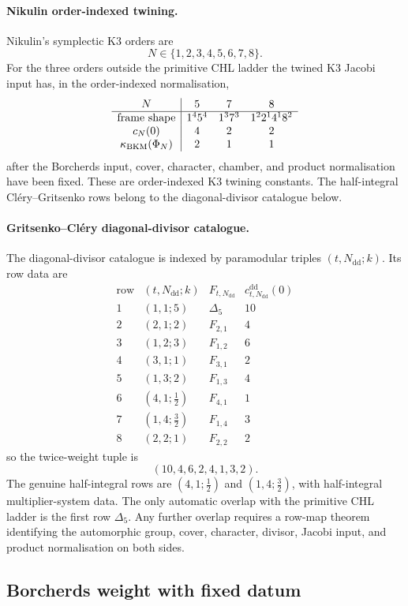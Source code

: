 \paragraph{Nikulin order-indexed twining.}
Nikulin's symplectic K3 orders are
\[
  N\in\{1,2,3,4,5,6,7,8\}.
\]
For the three orders outside the primitive CHL ladder the twined K3
Jacobi input has, in the order-indexed normalisation,
\[
\begin{array}{c|ccc}
N&5&7&8\\ \hline
\text{frame shape}&1^4 5^4&1^3 7^3&1^2 2^1 4^1 8^2\\
c_N(0)&4&2&2\\
\kappa_{\mathrm{BKM}}(\Phi_N)&2&1&1
\end{array}
\]
after the Borcherds input, cover, character, chamber, and product
normalisation have been fixed.  These are order-indexed K3 twining
constants.  The half-integral Cl\'ery--Gritsenko rows belong to the
diagonal-divisor catalogue below.

\paragraph{Gritsenko--Cl\'ery diagonal-divisor catalogue.}
The diagonal-divisor catalogue is indexed by paramodular triples
$(t,N_{\mathrm{dd}};k)$.  Its row data are
\[
\begin{array}{c|c|c|c}
\text{row}&(t,N_{\mathrm{dd}};k)&F_{t,N_{\mathrm{dd}}}
&c^{\mathrm{dd}}_{t,N_{\mathrm{dd}}}(0)\\ \hline
1&(1,1;5)&\Delta_5&10\\
2&(2,1;2)&F_{2,1}&4\\
3&(1,2;3)&F_{1,2}&6\\
4&(3,1;1)&F_{3,1}&2\\
5&(1,3;2)&F_{1,3}&4\\
6&(4,1;\tfrac12)&F_{4,1}&1\\
7&(1,4;\tfrac32)&F_{1,4}&3\\
8&(2,2;1)&F_{2,2}&2
\end{array}
\]
so the twice-weight tuple is
\[
  (10,4,6,2,4,1,3,2).
\]
The genuine half-integral rows are $(4,1;\tfrac12)$ and
$(1,4;\tfrac32)$, with half-integral multiplier-system data.
The only automatic overlap with the primitive CHL ladder is the
first row $\Delta_5$.  Any further overlap requires a row-map theorem
identifying the automorphic group, cover, character, divisor, Jacobi
input, and product normalisation on both sides.

\subsection*{Borcherds weight with fixed datum}

